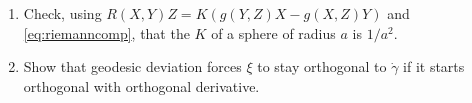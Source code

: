 \begin{exercises}
\begin{enumerate}[nosep]
\item Check, using $R(X,Y)Z=K(g(Y,Z)X-g(X,Z)Y)$ and \eqref{eq:riemanncomp}, that the $K$ of a sphere of radius $a$ is $1/a^2$.
\item Show that geodesic deviation forces $\xi$ to stay orthogonal to $\dot\gamma$ if it starts orthogonal with orthogonal derivative.
\end{enumerate}
\end{exercises}
